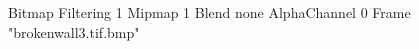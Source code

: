 {Bitmap
	{Filtering 1}
	{Mipmap 1}
	{Blend none}
	{AlphaChannel 0}
	{Frame "brokenwall3.tif.bmp"}
}
